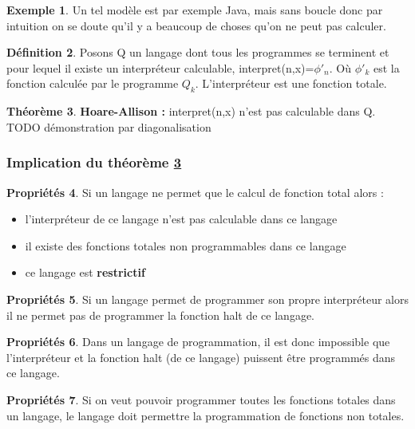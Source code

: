 \documentclass[11pt,a4paper]{article}
\theoremstyle{definition}
\newtheorem{mydef}{Définition}
\newtheorem{myprop}[mydef]{Propriétés}
\newtheorem{mytheo}[mydef]{Théorème}
\newtheorem{myexem}[mydef]{Exemple}
\begin{document}
\begin{myexem}
	Un tel modèle est par exemple Java, mais sans boucle 
	donc par intuition on se doute qu'il y a beaucoup de choses qu'on ne peut pas 
	calculer.
\end{myexem}

\begin{mydef}
	Posons Q un langage dont tous les programmes se terminent et pour 
	lequel il existe un interpréteur calculable, interpret(n,x)=$\phi'_n$. Où
	$\phi'_k$ est la fonction calculée par le programme $Q_k$. L'interpréteur est une 
	fonction totale.
\end{mydef}

\begin{mytheo}
	\label{Hoare_Allison}
	\textbf{Hoare-Allison :}
	interpret(n,x) n'est pas calculable dans Q.\\
	TODO démonstration par diagonalisation
\end{mytheo}



\subsubsection{Implication du théorème \ref{Hoare_Allison} }

\begin{myprop}
	Si un langage ne permet que le calcul de fonction total alors :
	\begin{itemize}
		\item l'interpréteur de ce langage n'est pas calculable dans ce langage
		\item il existe des fonctions totales non programmables dans ce langage
		\item ce langage est \bf{restrictif}
	\end{itemize}
\end{myprop}
	
\begin{myprop}
	Si un langage permet de programmer son propre interpréteur alors il ne permet 
	pas de programmer la fonction halt de ce langage.
\end{myprop}

\begin{myprop}
	Dans un langage de programmation, il est donc impossible que 
	l'interpréteur et la fonction halt (de ce langage) puissent être programmés dans ce langage.
\end{myprop}

\begin{myprop}
	Si on veut pouvoir programmer toutes les fonctions 
	totales dans un langage, le langage doit permettre la programmation de 
	fonctions non totales.
\end{myprop}
\end{document}
